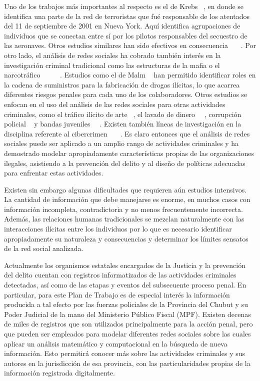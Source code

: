Uno de los trabajos más importantes al respecto es el de Krebs ~\cite{ref_article7}, en donde se identifica una parte de la red de terroristas que fué responsable de los atentados del 11 de septiembre de 2001 en Nueva York.  Aquí identifica agrupaciones de individuos que se conectan entre sí por los pilotos responsables del secuestro de las aeronaves. Otros estudios similares han sido efectivos en consecuencia ~\cite{ref_article8}~\cite{ref_article9}~\cite{ref_article10}.  Por otro lado, el análisis de redes sociales ha cobrado también interés en la investigación criminal tradicional como las estructuras de la mafia o el narcotráfico ~\cite{ref_article11}~\cite{ref_article12}~\cite{ref_article13}~\cite{ref_article14}~\cite{ref_article15}. Estudios como el de Malm ~\cite{ref_article16} han permitido identificar roles en la cadena de suministros para la fabricación de drogas ilícitas, lo que acarrea diferentes riesgos penales para cada uno de los colaboradores.  Otros estudios se enfocan en el uso del análisis de las redes sociales para otras actividades criminales, como el tráfico ilícito de arte ~\cite{ref_article17}, el lavado de dinero ~\cite{ref_article18}~\cite{ref_article19}, corrupción policial ~\cite{ref_article20} y bandas juveniles ~\cite{ref_article21}~\cite{ref_article22}. Existen también líneas de investigación en la disciplina referente al cibercrimen ~\cite{ref_article23}~\cite{ref_article24}~\cite{ref_article25}. Es claro entonces que el análisis de redes sociales puede ser aplicado a un amplio rango de actividades criminales y ha demostrado modelar apropiadamente características propias de las organizaciones ilegales, asistiendo a la prevención del delito y al diseño de políticas adecuadas para enfrentar estas actividades.

Existen sin embargo algunas dificultades que requieren aún estudios intensivos. La cantidad de información que debe manejarse es enorme, en muchos casos con información incompleta, contradictoria y no menos frecuentemente incorrecta. Además, las relaciones humanas tradicionales se mezclan naturalmente con las interacciones ilícitas entre los individuos por lo que es necesario identificar apropiadamente su naturaleza y consecuencias y determinar los límites sensatos de la red social analizada. 

Actualmente los organismos estatales encargados de la Justicia y la prevención del delito cuentan con registros informatizados de las actividades criminales detectadas, así como de las etapas y eventos del subsecuente proceso penal. En particular, para este Plan de Trabajo es de especial interés la información producida a tal efecto por las fuerzas policiales de la Provincia del Chubut y su Poder Judicial de la mano del Ministerio Público Fiscal (MPF). Existen decenas de miles de registros que son utilizados principalmente para la acción penal, pero que pueden ser empleados para modelar diferentes redes sociales sobre las cuales aplicar un análisis matemático y computacional en la búsqueda de nueva información. Esto permitirá conocer más sobre las actividades criminales y sus autores en la jurisdicción de esa provincia, con las particularidades propias de la información registrada digitalmente.

